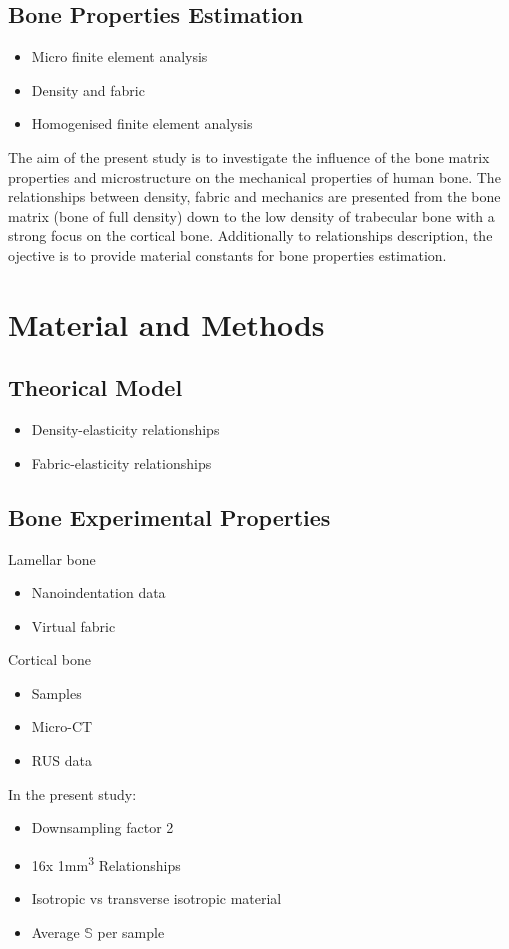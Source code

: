 \documentclass[a4paper,fleqn]{DC_ArtStyle}
\begin{document}
	\subsection{Bone Properties Estimation}
	\begin{itemize}
		\item Micro finite element analysis
		\item Density and fabric
		\item Homogenised finite element analysis
	\end{itemize}
	The aim of the present study is to investigate the influence of the bone matrix properties and microstructure on the mechanical properties of human bone.
	The relationships between density, fabric and mechanics are presented from the bone matrix (bone of full density) down to the low density of trabecular bone with a strong focus on the cortical bone.
	Additionally to relationships description, the ojective is to provide material constants for bone properties estimation.

	
	\section{Material and Methods}
	\subsection{Theorical Model}
	\begin{itemize}
		\item Density-elasticity relationships
		\item Fabric-elasticity relationships
	\end{itemize}

	\subsection{Bone Experimental Properties}
	Lamellar bone
	\begin{itemize}
		\item Nanoindentation data
		\item Virtual fabric
	\end{itemize}

	Cortical bone
	\begin{itemize}
		\item Samples
		\item Micro-CT
		\item RUS data
	\end{itemize}
	In the present study:
	\begin{itemize}
		\item Downsampling factor 2
		\item 16x 1mm\textsuperscript{3} Relationships
		\item Isotropic vs transverse isotropic material
		\item Average $\mathbb{S}$ per sample
	\end{itemize}
\end{document}
